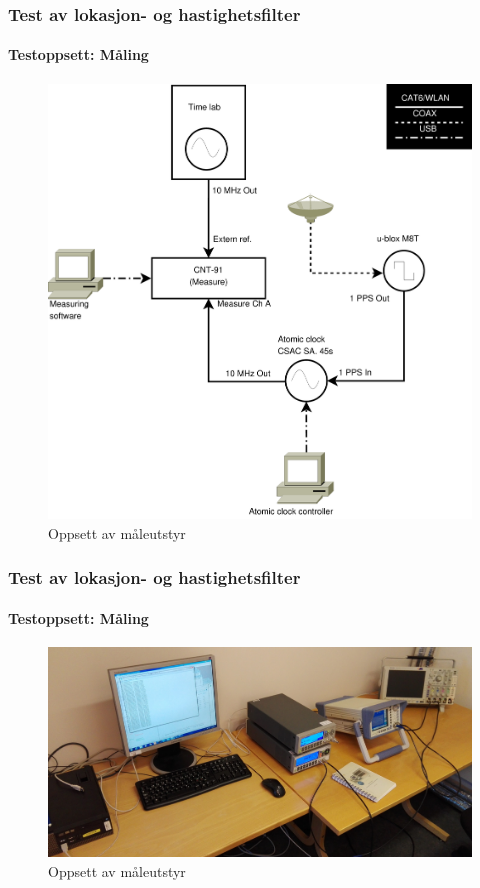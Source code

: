 \documentclass[xcolor=table]{beamer}
\begin{document}
\begin{frame}
\frametitle{Test av lokasjon- og hastighetsfilter}
\framesubtitle{Testoppsett: Måling}
      \begin{figure}
        \includegraphics[scale=0.25]{thesis/graphics/measure_setup.pdf}
        \caption{Oppsett av måleutstyr}
      \end{figure}
\end{frame}

\begin{frame}
\frametitle{Test av lokasjon- og hastighetsfilter}
\framesubtitle{Testoppsett: Måling}
      \begin{figure}
        \includegraphics[scale=0.08]{thesis/graphics/lab_setup_cropped.jpg}
        \caption{Oppsett av måleutstyr}
      \end{figure}
\end{frame}
\end{document}

